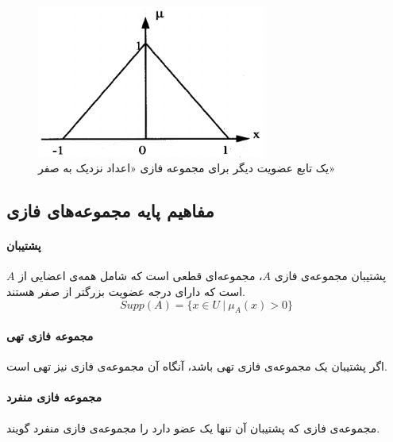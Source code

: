 \begin{exmp}
\begin{figure}[h]
	\centering 
	\includegraphics[width=75mm]{Images/Fig4.png}
	\vspace{-0.3cm}
	\caption{یک تابع عضویت دیگر برای مجموعه فازی «اعداد نزدیک به صفر»}\label{fig:f_4}
\end{figure}
\end{exmp}

 \subsection{ مفاهیم پایه مجموعه‌های فازی}
\paragraph{پشتیبان}
 پشتیبان مجموعه‌ی فازی $A$، مجموعه‌ای قطعی است که شامل همه‌ی اعضایی از $A$ است که دارای درجه عضویت بزرگتر از صفر هستند.
 \begin{equation}\label{eq:e_supp}
 	Supp(A)=\{ x \in U\ |\ \mu_{A}(x) > 0 \}
\end{equation}
\paragraph{مجموعه فازی تهی}
اگر پشتیبان یک مجموعه‌ی فازی تهی باشد، آنگاه آن مجموعه‌ی فازی نیز تهی است. 
\paragraph{مجموعه‌ فازی منفرد}
مجموعه‌ی فازی که پشتیبان آن تنها یک عضو دارد را مجموعه‌ی فازی منفرد
 گویند.
